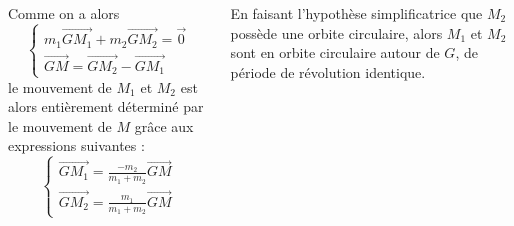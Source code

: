 \documentclass{beamer}
\begin{document}
\begin{frame}
{\begin{columns}[T]
				Comme on a alors
				\begin{equation*}
					\begin{cases}
						m_1 \overrightarrow{GM_1} + m_2 \overrightarrow{GM_2} = \vec{0} \\
						\overrightarrow{GM} = \overrightarrow{GM_2} - \overrightarrow{GM_1}
					\end{cases}
				\end{equation*}
				le mouvement de $M_1$ et $M_2$ est alors entièrement déterminé par le mouvement de $M$ grâce aux expressions suivantes :
				\begin{equation*}
					\begin{cases}
						\overrightarrow{GM_1} = \frac{-m_2}{m_1 + m_2} \overrightarrow{GM} \\
						\overrightarrow{GM_2} = \frac{m_1}{m_1 + m_2} \overrightarrow{GM}
					\end{cases}
				\end{equation*}
				
				En faisant l'hypothèse simplificatrice que $M_2$ possède une orbite circulaire, alors $M_1$ et $M_2$ sont en orbite circulaire autour de $G$, de période de révolution identique.
			\end{columns}
		}
	\end{frame}
	
	
\end{document}
